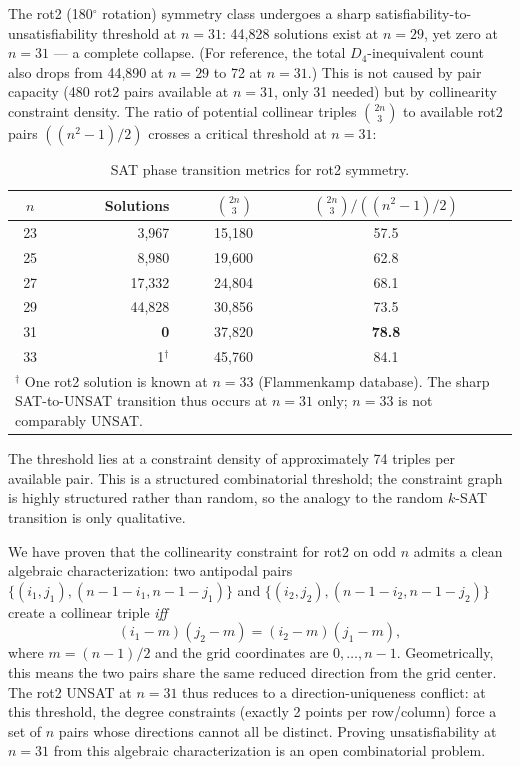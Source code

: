 \documentclass[11pt,a4paper]{article}
\theoremstyle{plain}
\theoremstyle{definition}
\begin{document}
The rot2 (180$^\circ$ rotation) symmetry class undergoes a sharp satisfiability-to-unsatisfiability threshold at $n=31$: 44,828 solutions exist at $n=29$, yet zero at $n=31$ --- a complete collapse. (For reference, the total $D_4$-inequivalent count also drops from 44,890 at $n=29$ to 72 at $n=31$.) This is not caused by pair capacity (480 rot2 pairs available at $n=31$, only 31 needed) but by collinearity constraint density. The ratio of potential collinear triples $\binom{2n}{3}$ to available rot2 pairs $((n^2-1)/2)$ crosses a critical threshold at $n=31$:

\begin{table}[H]
\centering
\caption{SAT phase transition metrics for rot2 symmetry.}
\label{tab:rot2transition}
\begin{tabular}{crrc}
\toprule
$n$ & Solutions & $\binom{2n}{3}$ & $\binom{2n}{3} / ((n^2-1)/2)$ \\
\midrule
23 & 3,967 & 15,180 & 57.5 \\
25 & 8,980 & 19,600 & 62.8 \\
27 & 17,332 & 24,804 & 68.1 \\
29 & 44,828 & 30,856 & 73.5 \\
31 & \textbf{0} & 37,820 & \textbf{78.8} \\
33 & 1$^\dag$ & 45,760 & 84.1 \\
\bottomrule
\multicolumn{5}{l}{\footnotesize $^\dag$ One rot2 solution is known at $n=33$ (Flammenkamp database). The sharp SAT-to-UNSAT transition thus occurs at $n=31$ only; $n=33$ is not comparably UNSAT.}
\end{tabular}
\end{table}

The threshold lies at a constraint density of approximately 74 triples per available pair. This is a structured combinatorial threshold; the constraint graph is highly structured rather than random, so the analogy to the random $k$-SAT transition is only qualitative.

We have proven that the collinearity constraint for rot2 on odd $n$ admits a clean algebraic characterization: two antipodal pairs $\{(i_1,j_1),(n-1-i_1,n-1-j_1)\}$ and $\{(i_2,j_2),(n-1-i_2,n-1-j_2)\}$ create a collinear triple \emph{iff}
\[
(i_1-m)(j_2-m) = (i_2-m)(j_1-m),
\]
where $m=(n-1)/2$ and the grid coordinates are $0,\dots,n-1$. Geometrically, this means the two pairs share the same reduced direction from the grid center. The rot2 UNSAT at $n=31$ thus reduces to a direction-uniqueness conflict: at this threshold, the degree constraints (exactly 2 points per row/column) force a set of $n$ pairs whose directions cannot all be distinct. Proving unsatisfiability at $n=31$ from this algebraic characterization is an open combinatorial problem.
\end{document}
